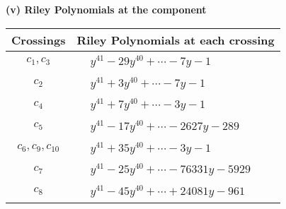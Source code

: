 \documentclass[1p]{elsarticle_modified}
\theoremstyle{definition}
\begin{document}
\newpage\renewcommand{\arraystretch}{1}
\flushleft \textbf{(v) Riley Polynomials at the component}\newline \\
\begin{tabular}{m{50pt}|m{274pt}}
Crossings & \hspace{64pt}Riley Polynomials at each crossing \\
\hline $$\begin{aligned}c_{1},c_{3}\end{aligned}$$&$\begin{aligned}
&y^{41}-29 y^{40}+\cdots-7 y-1
\end{aligned}$\\
\hline $$\begin{aligned}c_{2}\end{aligned}$$&$\begin{aligned}
&y^{41}+3 y^{40}+\cdots-7 y-1
\end{aligned}$\\
\hline $$\begin{aligned}c_{4}\end{aligned}$$&$\begin{aligned}
&y^{41}+7 y^{40}+\cdots-3 y-1
\end{aligned}$\\
\hline $$\begin{aligned}c_{5}\end{aligned}$$&$\begin{aligned}
&y^{41}-17 y^{40}+\cdots-2627 y-289
\end{aligned}$\\
\hline $$\begin{aligned}c_{6},c_{9},c_{10}\end{aligned}$$&$\begin{aligned}
&y^{41}+35 y^{40}+\cdots-3 y-1
\end{aligned}$\\
\hline $$\begin{aligned}c_{7}\end{aligned}$$&$\begin{aligned}
&y^{41}-25 y^{40}+\cdots-76331 y-5929
\end{aligned}$\\
\hline $$\begin{aligned}c_{8}\end{aligned}$$&$\begin{aligned}
&y^{41}-45 y^{40}+\cdots+24081 y-961
\end{aligned}$\\
\hline
\end{tabular}\\~\\
\end{document}
